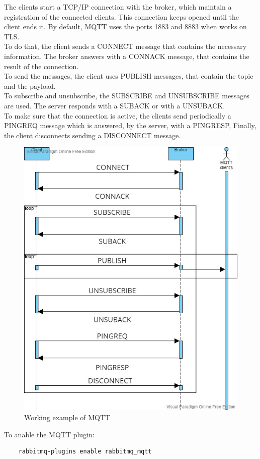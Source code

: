 \documentclass[12pt]{article}
\begin{document}
The clients start a TCP/IP connection with the broker, which maintain a registration of the connected clients. This connection keeps opened until the client ends it. By default, MQTT uses the ports 1883 and 8883 when works on TLS.\\
To do that, the client sends a CONNECT message that contains the necessary information. The broker answers with a CONNACK message, that contains the result of the connection.\\
To send the messages, the client uses PUBLISH messages, that contain the topic and the payload.\\
To subscribe and unsubscribe, the SUBSCRIBE and UNSUBSCRIBE messages are used. The server responds with a SUBACK or with a UNSUBACK.\\
To make sure that the connection is active, the clients send periodically a PINGREQ message which is answered, by the server, with a PINGRESP, Finally, the client disconnects sending a DISCONNECT message.\\
\begin{figure}[H]
    \centering
    \includegraphics[scale = 0.6]{Images/DSS RabbitMQ.jpg}
    \caption{Working example of MQTT}
    \label{fig:mqtt_example}
\end{figure}
To anable the MQTT plugin:
\begin{lstlisting}
    rabbitmq-plugins enable rabbitmq_mqtt
\end{lstlisting}
\end{document}
